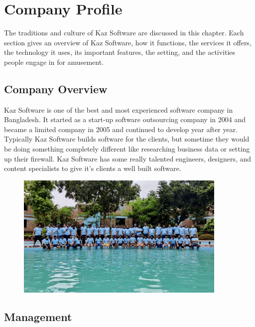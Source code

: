 \chapter{Company Profile}

The traditions and culture of Kaz Software are discussed in this chapter.
Each section gives an overview of Kaz Software, how it functions, the services it offers, the technology it uses, its important features, the setting, and the activities people engage in for amusement.

\section{Company Overview}

Kaz Software is one of the best and most experienced software company in Bangladesh.
It started as a start-up software outsourcing company in 2004 and became a limited company in 2005 and continued to develop year after year.
Typically Kaz Software builds software for the clients, but sometime they would be doing something completely different like researching business data or setting up their firewall.
Kaz Software has some really talented engineers, designers, and content specialists to give it's clients a well built software.

\begin{figure}[h]
    \begin{center}
        \includegraphics[width=0.9\textwidth]{images/Chapter2/cto_tour_mid.jpeg}
        \label{fig:CTO_Tour}
    \end{center}
\end{figure}

\section{Management}


